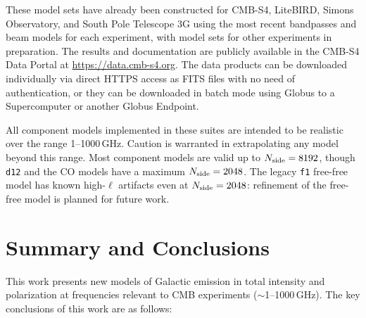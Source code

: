 \documentclass[twocolumn]{aastex631}
\begin{document}
These model sets have already been constructed for CMB-S4, LiteBIRD, Simons Observatory, and South Pole Telescope 3G using the most recent bandpasses and beam models for each experiment, with model sets for other experiments in preparation. The results and documentation are publicly available in the CMB-S4 Data Portal at \url{https://data.cmb-s4.org}. The data products can be downloaded individually via direct HTTPS access as FITS files with no need of authentication, or they can be downloaded in batch mode using Globus to a Supercomputer or another Globus Endpoint.

All component models implemented in these suites are intended to be realistic over the range 1--1000\,GHz. Caution is warranted in extrapolating any model beyond this range. Most component models are valid up to $N_{\rm side}=8192$, though \texttt{d12} and the CO models have a maximum $N_{\rm side}=2048$. The legacy \texttt{f1} free-free model has known high-$\ell$ artifacts even at $N_{\rm side} = 2048$: refinement of the free-free model is planned for future work.

\section{Summary and Conclusions} \label{sec:summary}

This work presents new models of Galactic emission in total intensity and polarization at frequencies relevant to CMB experiments ($\sim$1--1000\,GHz). The key conclusions of this work are as follows:
\end{document}
